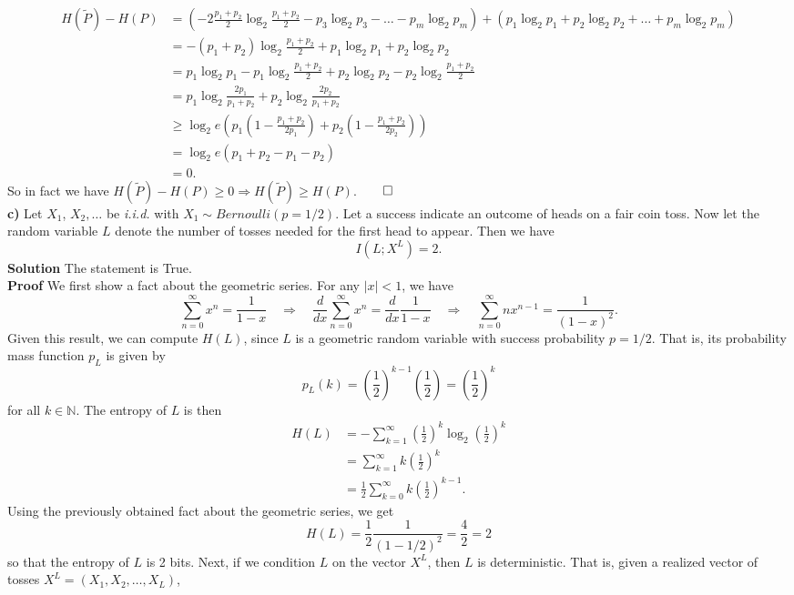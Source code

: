\documentclass[11pt, letterpaper]{article}
\newcommand{\mbb}[1]{\mathbb{#1}}
\begin{document}
\begin{align*}
    H(\tilde{P})-H(P)&=\left(-2\frac{p_1+p_2}{2}\log_2\frac{p_1+p_2}{2}-p_3\log_2p_3-\dots-p_m\log_2p_m\right)+\left(p_1\log_2p_1+p_2\log_2p_2+\dots+p_m\log_2p_m\right)\\
    &=-(p_1+p_2)\log_2\frac{p_1+p_2}{2}+p_1\log_2p_1+p_2\log_2p_2\\
    &=p_1\log_2p_1-p_1\log_2\frac{p_1+p_2}{2}+p_2\log_2p_2-p_2\log_2\frac{p_1+p_2}{2}\\
    &=p_1\log_2\frac{2p_1}{p_1+p_2}+p_2\log_2\frac{2p_2}{p_1+p_2}\\
    &\geq \log_2e\left(p_1\left(1-\frac{p_1+p_2}{2p_1}\right)+p_2\left(1-\frac{p_1+p_2}{2p_2}\right)\right)\tag{fundamental inequality of the logarithm}\\
    &=\log_2e(p_1+p_2-p_1-p_2)\\
    &=0.
\end{align*}
So in fact we have $H(\tilde{P})-H(P)\geq 0\Rightarrow H(\tilde{P})\geq H(P)$.\hfill{$\qed$}\\[10pt]
{\bf c)} Let $X_1$, $X_2,\dots$ be {\it i.i.d.} with $X_1\sim Bernoulli(p=1/2)$. Let a success indicate an outcome of heads on a fair coin toss. Now let the random variable $L$
denote the number of tosses needed for the first head to appear. Then we have
\[I(L;X^L)=2.\tag{bits}\]
{\bf Solution} The statement is True.\\[10pt]
{\bf Proof} We first show a fact about the geometric series. For any $|x|<1$, we have
\[\sum_{n=0}^\infty x^n=\frac{1}{1-x}\quad\Rightarrow\quad \frac{d}{dx}\sum_{n=0}^\infty x^n=\frac{d}{dx}\frac{1}{1-x}\quad\Rightarrow\quad \sum_{n=0}^\infty nx^{n-1}=\frac{1}{(1-x)^2}.\]
Given this result, we can compute $H(L)$, since $L$ is a geometric random variable with success probability $p=1/2$. That is, its probability mass function $p_L$ is given by
\[p_L(k)=\left(\frac{1}{2}\right)^{k-1}\left(\frac{1}{2}\right)=\left(\frac{1}{2}\right)^k\]
for all $k\in\mbb{N}$. The entropy of $L$ is then
\begin{align*}
    H(L)&=-\sum_{k=1}^\infty \left(\frac{1}{2}\right)^k\log_2\left(\frac{1}{2}\right)^k\\
    &=\sum_{k=1}^\infty k\left(\frac{1}{2}\right)^k\\
    &=\frac{1}{2}\sum_{k=0}^\infty k\left(\frac{1}{2}\right)^{k-1}.
\end{align*}
Using the previously obtained fact about the geometric series, we get
\[H(L)=\frac{1}{2}\frac{1}{(1-1/2)^2}=\frac{4}{2}=2\]
so that the entropy of $L$ is 2 bits. Next, if we condition $L$ on the vector $X^L$, then $L$ is deterministic. That is, given a realized vector of tosses $X^L=(X_1,X_2,\dots,X_L)$,
\end{document}
